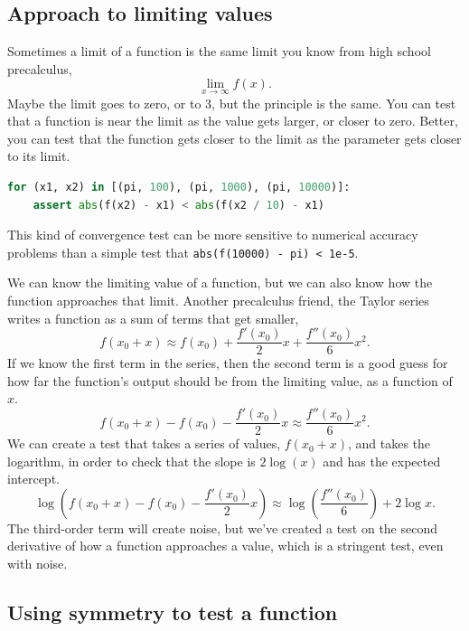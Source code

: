 \documentclass[fleqn,10pt]{olplainarticle}
\begin{document}
\subsection{Approach to limiting values}

Sometimes a limit of a function is the same limit you know
from high school precalculus,
\begin{equation}
  \lim_{x\rightarrow\infty} f(x).
\end{equation}
Maybe the limit goes to zero, or to 3, but the principle is
the same. You can test that a function is near the limit
as the value gets larger, or closer to zero. Better, you can
test that the function gets closer to the limit as the
parameter gets closer to its limit.
\begin{lstlisting}[language=python]
for (x1, x2) in [(pi, 100), (pi, 1000), (pi, 10000)]:
    assert abs(f(x2) - x1) < abs(f(x2 / 10) - x1)
\end{lstlisting}
This kind of convergence test can be more sensitive to
numerical accuracy problems than a simple test
that \lstinline|abs(f(10000) - pi) < 1e-5|.

We can know the limiting value of a
function, but we can also know how the function approaches
that limit. Another precalculus friend, the Taylor series
writes a function as a sum of terms that get smaller,
\begin{equation}
  f(x_0+x) \approx f(x_0) + \frac{f'(x_0)}{2}x + \frac{f''(x_0)}{6}x^2.
\end{equation}
If we know the first term in the series, then the second term
is a good guess for how far the function's output should be from
the limiting value, as a function of $x$.
\begin{equation}
  f(x_0+x)  - f(x_0) - \frac{f'(x_0)}{2}x \approx \frac{f''(x_0)}{6}x^2.
\end{equation}
We can create a test that takes a series of values,
$f(x_0+x)$, and takes the logarithm, in order to check that
the slope is $2\log(x)$ and has the expected intercept.
\begin{equation}
  \log\left(f(x_0+x)  - f(x_0) - \frac{f'(x_0)}{2}x\right) \approx \log\left(\frac{f''(x_0)}{6}\right) + 2\log x.
\end{equation}
The third-order term will create noise, but we've created a
test on the second derivative of how a function approaches a
value, which is a stringent test, even with noise.


\subsection{Using symmetry to test a function}\label{sec:symmetry-test}
\end{document}
